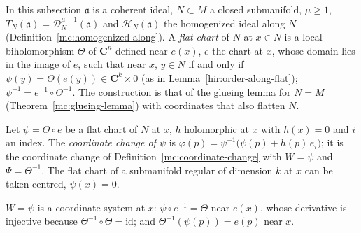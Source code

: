 In this subsection \(\mathfrak a\) is a coherent ideal, \(N\subset M\) a closed submanifold, \(\mu\ge1\), \(T_N(\mathfrak a)=\mathcal D_N^{\mu-1}(\mathfrak a)\) and
\(\mathcal H_N(\mathfrak a)\) the homogenized ideal along \(N\) (Definition~\ref{mc:homogenized-along}). A \emph{flat chart} of \(N\) at \(x\in N\) is a local
biholomorphism \(\Theta\) of \(\mathbf C^n\) defined near \(e(x)\), \(e\) the chart at \(x\), whose domain lies in the image of \(e\), such that near \(x\), \(y\in N\) if and only if
\(\psi(y)=\Theta(e(y))\in\mathbf C^k\times0\) (as in Lemma~\ref{hir:order-along-flat}); \(\psi^{-1}=e^{-1}\circ\Theta^{-1}\). The construction is that of the
glueing lemma for \(N=M\) (Theorem~\ref{mc:glueing-lemma}) with coordinates that also flatten \(N\).

\begin{definition}
\label{mc:flat-change}
\leanok
Let \(\psi=\Theta\circ e\) be a flat chart of \(N\) at \(x\), \(h\) holomorphic at \(x\) with \(h(x)=0\) and \(i\) an index. The \emph{coordinate change of \(\psi\)} is
\(\varphi(p)=\psi^{-1}\bigl(\psi(p)+h(p)\,e_i\bigr)\); it is the coordinate change of Definition~\ref{mc:coordinate-change} with \(W=\psi\) and \(\Psi=\Theta^{-1}\).
The flat chart of a submanifold regular of dimension \(k\) at \(x\) can be taken centred, \(\psi(x)=0\).
\end{definition}
\(W=\psi\) is a coordinate system at \(x\): \(\psi\circ e^{-1}=\Theta\) near \(e(x)\), whose derivative is injective because \(\Theta^{-1}\circ\Theta=\mathrm{id}\); and
\(\Theta^{-1}(\psi(p))=e(p)\) near \(x\).

